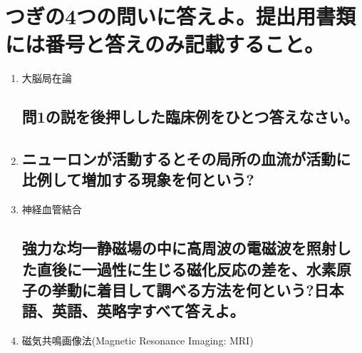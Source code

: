 \documentclass[titlepage,a4paper]{jsarticle}
\begin{document}
\section{つぎの4つの問いに答えよ。提出用書類には番号と答えのみ記載すること。}
\begin{enumerate}
      \subsection{「ヒトの高度な精神活動のそれぞれの機能系にはある程度の機能局在がある」という考え方を何という?}
      \item 大脳局在論
            \subsection{問1の説を後押しした臨床例をひとつ答えなさい。}
      \item %
            \subsection{ニューロンが活動するとその局所の血流が活動に比例して増加する現象を何という?}
      \item 神経血管結合
            \subsection{強力な均一静磁場の中に高周波の電磁波を照射した直後に一過性に生じる磁化反応の差を、水素原子の挙動に着目して調べる方法を何という?日本語、英語、英略字すべて答えよ。}
      \item 磁気共鳴画像法(Magnetic Resonance Imaging: MRI)
\end{enumerate}
\end{document}
